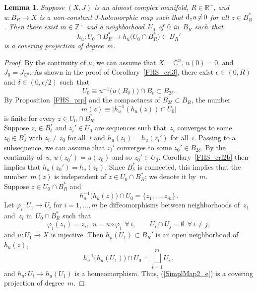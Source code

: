 \documentclass[11pt]{article}
\numberwithin{equation}{section}
\newtheorem{lmm}[thm]{Lemma}
\theoremstyle{definition}
\def\BE#1{\begin{equation}\label{#1}}
\def\EE{\end{equation}}
\def\eref#1{(\ref{#1})}
\def\ov#1{\overline{#1}}
\def\lra{\longrightarrow}
\def\C{\mathbb{C}}
\def\R{\mathbb R}
\def\Z{{\mathbb Z}}
\def\de{\delta}
\def\ep{\epsilon}
\def\vph{\varphi}
\def\eset{\emptyset}
\def\nd{\textnormal{d}}
\begin{document}
\begin{lmm}\label{SimplMap_lmm2}
Suppose $(X,J)$ is an almost complex manifold, $R\!\in\!\R^+$, 
and $u\!:B_R\!\lra\!X$ is a non-constant $J$-holomorphic map
such that $\nd_zu\!\neq\!0$ for all $z\!\in\!B_R^*$.
Then there exist $m\!\in\!\Z^+$ and a neighborhood~$U_0$ of~$0$ in~$B_R$
such~that 
\BE{SimplMap2_e}h_u\!: U_0\!\cap\!B_R^*\lra h_u\big(U_0\!\cap\!B_R^*\big)\subset B_R'\EE 
is a covering projection of degree~$m$.
\end{lmm}

\begin{proof}
By the continuity of $u$, we can assume that $X\!=\!\C^n$, $u(0)\!=\!0$,
and $J_0\!=\!J_{\C^n}$. 
As shown in the proof of Corollary~\ref{FHS_crl3}, 
there exist $\ep\!\in\!(0,R)$ and $\de\!\in\!(0,\ep/2)$
such~that
$$U_0\equiv u^{-1}\big(u(B_{\de})\big)\!\cap\!B_{\ep}\subset B_{2\de}.$$
By Proposition~\ref{FHS_prp} and the compactness of $\ov{B_{2\de}}\!\subset\!B_R$, 
the number 
$$m(z)\equiv \big|h_u^{-1}(h_u(z))\!\cap\!U_0\big|$$
is finite for every $z\!\in\!U_0\!\cap\!B_R^*$.\\

\noindent
Suppose $z_i\!\in\!B_{\de}^*$ and $z_i'\!\in\!U_0$
are sequences such that~$z_i$ converges to some $z_0\!\in\!B_{\de}^*$
with $z_i\!\neq\!z_0$ for all~$i$
and \hbox{$h_u(z_i)\!=\!h_u(z_i')$} for all~$i$.
Passing to a subsequence, we can assume that $z_i'$ converges to some 
\hbox{$z_0'\!\in\!\ov{B_{2\de}}$}.
By the continuity of~$u$, $u(z_0')\!=\!u(z_0)$ and so $z_0'\!\in\!U_0$.
Corollary~\ref{FHS_crl2b} then implies that $h_u(z_0')\!=\!h_u(z_0)$.
Since $B_{\de}^*$ is connected, this implies that 
the number~$m(z)$ is independent of $z\!\in\!U_0\!\cap\!B_R^*$;
we denote it by~$m$.\\

\noindent
Suppose $z\!\in\!U_0\!\cap\!B_R^*$ and
$$h_u^{-1}\big(h_u(z)\big)\cap U_0=\big\{z_1,\ldots,z_m\big\}\,.$$
Let $\vph_i\!:U_1\!\lra\!U_i$ for $i\!=\!1,\ldots,m$ be diffeomorphisms between 
neighborhoods of~$z_1$ and~$z_i$ in~$U_0\!\cap\!B_R^*$ such that 
$$\vph_i(z_1)=z_i,~~ u=u\!\circ\!\vph_i~~\forall\,i,\qquad
U_i\cap U_j=\eset~~\forall\,i\!\neq\!j,$$
and $u\!:U_1\!\lra\!X$ is injective.
Then $h_u(U_1)\!\subset\!B_R'$ is an open neighborhood of $h_u(z)$, 
$$h_u^{-1}\!\big(h_u(U_1)\!\big)\cap U_0=\bigsqcup_{i=1}^mU_i\,,$$
and $h_u\!:U_i\!\lra\!h_u(U_1)$ is a homeomorphism.
Thus, \eref{SimplMap2_e} is a covering projection of degree~$m$.
\end{proof}
\end{document}
